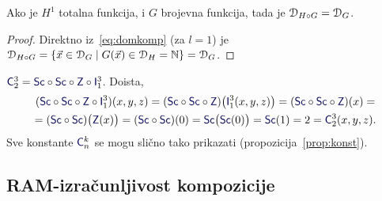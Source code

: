 \begin{korolar}[{name=[kompozicija s totalnom funkcijom slijeva ne mijenja domenu]}]\label{kor:comptot}
    Ako je $H^1$ totalna funkcija, i $G$ brojevna funkcija, tada je $\mathcal D_{H\circ G}=\mathcal D_{G}$.
\end{korolar}
\begin{proof}
    Direktno iz~\eqref{eq:domkomp} (za $l=1$) je $\mathcal D_{H\circ G}=\{\vec x\in\mathcal D_{G}\mid G(\vec x)\in\mathcal D_{H}={\mathbb N}\}=\mathcal D_{G}$.
\end{proof}

\begin{primjer}[{name=[prikaz konstante kao kompozicije inicijalnih funkcija]}]\label{pr:C23}
$\f C_2^3=\f{Sc}\circ\f{Sc}\circ\f Z\circ\f I_1^3$. Doista,
\begin{multline}
(\f{Sc}\circ\f{Sc}\circ\f Z\circ\f I_1^3)(x,y,z)=(\f{Sc}\circ\f{Sc}\circ\f Z)\bigl(\f I_1^3(x,y,z)\bigr)=(\f{Sc}\circ\f{Sc}\circ\f Z)(x)=\\
=(\f{Sc}\circ\f{Sc})\bigl(\f Z(x)\bigr)=(\f{Sc}\circ\f{Sc})(0)=\f{Sc}\bigl(\f{Sc}(0)\bigr)=\f{Sc}(1)=2=\f C_2^3(x,y,z).
\end{multline}
    Sve konstante $\f C_n^k$ se mogu slično tako prikazati (propozicija~\ref{prop:konst}).
\end{primjer}

\subsection{RAM-izračunljivost kompozicije}


